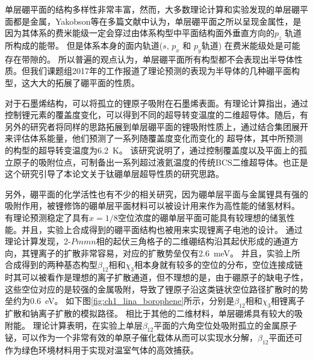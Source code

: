 单层硼平面的结构多样性非常丰富，然而，大多数理论计算和实验发现的单层硼平面都是金属\cite{zhang2017two}，Yakobson等\cite{penev2012polymorphism,penev2016can}在多篇文献中认为，单层硼平面之所以呈现金属性，是因为其体系的费米能级一定会穿过由体系构型中平面结构面外垂直方向的$p_z$ 轨道所构成的能带。
但是体系本身的面内轨道($s$, $p_x$ 和 $p_y$轨道) 在费米能级处是可能存在带隙的。
所以普遍的观点认为，单层硼平面所有构型都不会表现出半导体性质。但我们课题组2017年的工作\cite{xu2017two}报道了理论预测的表现为半导体的几种硼平面构型，这大大的拓展了硼平面的性质。

对于石墨烯结构，可以将孤立的锂原子吸附在石墨烯表面。有理论计算指出\cite{profeta2012phonon}，通过控制锂元素的覆盖度变化，可以得到不同的超导转变温度的二维超导体。随后，有另外的研究者\cite{wu2016lithium}将同样的思路拓展到单层硼平面的锂吸附性质上，通过结合集团展开来评估体系能量，他们预测了一系列随覆盖度变化而变化的 超导体，其中所预测的构型的超导转变温度为\SI{6.2}{\kelvin}。 该研究说明了，通过控制覆盖度以及平面上的孤立原子的吸附位点，可制备出一系列超过液氦温度的传统BCS二维超导体。也正是这个研究引导了本论文关于钛硼单层超导性质的研究思路。

另外，硼平面的化学活性也有不少的相关研究，因为硼单层平面与金属锂具有强的吸附作用，被锂修饰的硼单层平面材料可以被设计用来作为高性能的储氢材料。
有理论\cite{li2015ultrahigh}预测稳定了具有$x=1/8$空位浓度的硼单层平面可能具有较理想的储氢性能。并且，实验上合成得到的硼平面结构也被用来实现锂离子电池的设计。
通过理论计算\cite{jiang2016borophene}发现，2-$Pmmn$相的起伏三角格子的二维硼结构沿其起伏形成的通道方向，其锂离子的扩散非常容易，对应的扩散势垒仅有\SI{2.6}{\meV}。
并且，实验上所合成得到的两种基态构型$\beta_{12}$相和$\chi_3$相本身就有较多的空位的分布，空位连接成链时其可以被看作是理想的离子扩散通道\cite{zhang2016borophene}，但不理想的是，由于硼原子的缺电子性，这些空位对应的是较强的金属吸附，导致了锂原子沿这类链状空位路径扩散时的势垒约为\SI{0.6}{\eV}。
如下图\ref{fig:ch1_lina_borophene}所示，分别是$\beta_{12}$相和$\chi_3$相锂离子扩散和钠离子扩散的模拟路径。
相比于其他的二维材料，单层硼烯具有较大的吸附能。
理论计算表明\cite{ling2017nanosheet}，在实验上单层$\beta_{12}$平面的六角空位处吸附孤立的金属原子铋，可以作为一个非常有效的单原子催化载体从而可以实现水分解，$\beta_{12}$平面还可作为绿色环境材料用于实现对温室气体的高效捕获\cite{tan2017borophene}。

